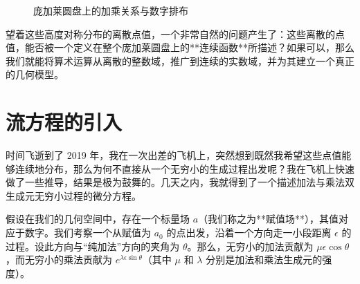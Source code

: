 \documentclass[a4paper,12pt]{book}
\numberwithin{problem}{section}
\numberwithin{definition}{section}
\numberwithin{lemma}{section}
\numberwithin{proposition}{section}
\numberwithin{theorem}{section}
\numberwithin{grammar}{section}
\numberwithin{program}{section}
\numberwithin{convention}{section}
\numberwithin{corollary}{section}
\begin{document}
\begin{figure}[ht]
    \centering
    \caption{庞加莱圆盘上的加乘关系与数字排布}
    \label{fig:assignment2}
\end{figure}

望着这些高度对称分布的离散点值，一个非常自然的问题产生了：这些离散的点值，能否被一个定义在整个庞加莱圆盘上的**连续函数**所描述？如果可以，那么我们就能将算术运算从离散的整数域，推广到连续的实数域，并为其建立一个真正的几何模型。

\section{流方程的引入}
\label{sec:flow_equation_intro}

时间飞逝到了 2019 年，我在一次出差的飞机上，突然想到既然我希望这些点值能够连续地分布，那么为何不直接从一个无穷小的生成过程出发呢？我在飞机上快速做了一些推导，结果是极为鼓舞的。几天之内，我就得到了一个描述加法与乘法双生成元无穷小过程的微分方程。

假设在我们的几何空间中，存在一个标量场 $a$（我们称之为**赋值场**），其值对应于数字。我们考察一个从赋值为 $a_0$ 的点出发，沿着一个方向走一小段距离 $\epsilon$ 的过程。设此方向与“纯加法”方向的夹角为 $\theta$。那么，无穷小的加法贡献为 $\mu \epsilon \cos \theta$，而无穷小的乘法贡献为 $e^{\lambda \epsilon \sin \theta}$（其中 $\mu$ 和 $\lambda$ 分别是加法和乘法生成元的强度）。
\end{document}

